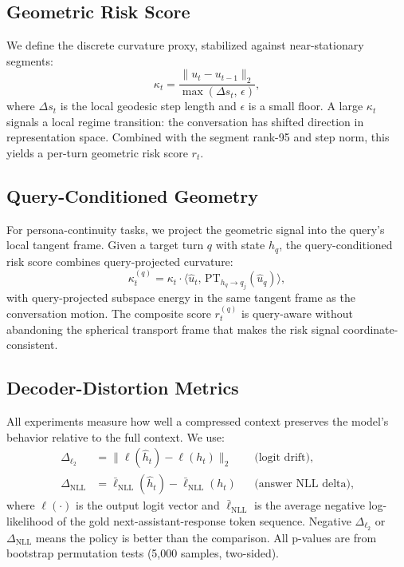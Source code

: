 \documentclass[conference]{IEEEtran}
\newcommand{\Logit}{\Delta_{\ell_2}}
\newcommand{\NLL}{\Delta_{\mathrm{NLL}}}
\begin{document}
\subsection{Geometric Risk Score}

We define the discrete curvature proxy, stabilized against near-stationary
segments:
\begin{equation}
\kappa_t = \frac{\lVert u_t - u_{t-1} \rVert_2}{\max(\Delta s_t,\, \epsilon)},
\end{equation}
where $\Delta s_t$ is the local geodesic step length and $\epsilon$ is a small
floor. A large $\kappa_t$ signals a local regime transition: the conversation
has shifted direction in representation space. Combined with the segment
rank-95 and step norm, this yields a per-turn geometric risk score $r_t$.

\subsection{Query-Conditioned Geometry}

For persona-continuity tasks, we project the geometric signal into the query's
local tangent frame. Given a target turn $q$ with state $h_q$, the
query-conditioned risk score combines query-projected curvature:
\begin{equation}
\kappa_t^{(q)} = \kappa_t \cdot \bigl\langle \hat{u}_t,\,
\mathrm{PT}_{h_q \rightarrow q_j}(\hat{u}_q) \bigr\rangle,
\end{equation}
with query-projected subspace energy in the same tangent frame as the
conversation motion. The composite score $r_t^{(q)}$ is query-aware without
abandoning the spherical transport frame that makes the risk signal
coordinate-consistent.

\subsection{Decoder-Distortion Metrics}
\label{sec:metrics}

All experiments measure how well a compressed context preserves the model's
behavior relative to the full context. We use:
\begin{align}
\Logit &= \bigl\lVert \ell(\hat{h}_t) - \ell(h_t) \bigr\rVert_2
  & &\text{(logit drift)},\\
\NLL &= \bar{\ell}_{\mathrm{NLL}}(\hat{h}_t) - \bar{\ell}_{\mathrm{NLL}}(h_t)
  & &\text{(answer NLL delta)},
\end{align}
where $\ell(\cdot)$ is the output logit vector and $\bar{\ell}_{\mathrm{NLL}}$
is the average negative log-likelihood of the gold next-assistant-response
token sequence. Negative $\Logit$ or $\NLL$ means the policy is better than
the comparison. All p-values are from bootstrap permutation tests
(5{,}000 samples, two-sided).
\end{document}
